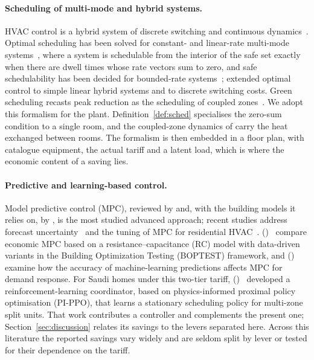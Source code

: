 \documentclass[10pt,a4paper,twocolumn]{article}
\newcommand{\citey}[1]{\citeauthor{#1} (\citeyear{#1})~\citep{#1}}
\theoremstyle{definition}
\begin{document}
\paragraph{Scheduling of multi-mode and hybrid systems.}
HVAC control is a hybrid system of discrete switching and continuous dynamics~\citep{henzinger_2000}. Optimal scheduling has been solved for constant- and linear-rate multi-mode systems~\citep{alur2012optimal,wojtczak2013optimal}, where a system is schedulable from the interior of the safe set exactly when there are dwell times whose rate vectors sum to zero, and safe schedulability has been decided for bounded-rate systems~\citep{alur2013safe}; \citet{mousa2016optimal,mousa2017optimal} extended optimal control to simple linear hybrid systems and to discrete switching costs. Green scheduling recasts peak reduction as the scheduling of coupled zones~\citep{nghiem2011green,nghiem2012scalable}. We adopt this formalism for the plant. Definition~\ref{def:sched} specialises the zero-sum condition to a single room, and the coupled-zone dynamics of \citet{nghiem2012scalable} carry the heat exchanged between rooms. The formalism is then embedded in a floor plan, with catalogue equipment, the actual tariff and a latent load, which is where the economic content of a saving lies.

\paragraph{Predictive and learning-based control.}
Model predictive control (MPC), reviewed by \citet{drgona2020mpc} and, with the building models it relies on, by \citet{kim2022mpcreview}, is the most studied advanced approach; recent studies address forecast uncertainty~\citep{hou2022mpc} and the tuning of MPC for residential HVAC~\citep{dhaliwal2026mpc}. \citey{zheng2024empc} compare economic MPC based on a resistance--capacitance (RC) model with data-driven variants in the Building Optimization Testing (BOPTEST) framework, and \citey{wang2024mldr} examine how the accuracy of machine-learning predictions affects MPC for demand response. For Saudi homes under this two-tier tariff, \citey{rl2026hvac} developed a reinforcement-learning coordinator, based on physics-informed proximal policy optimisation (PI-PPO), that learns a stationary scheduling policy for multi-zone split units. That work contributes a controller and complements the present one; Section~\ref{sec:discussion} relates its savings to the levers separated here. Across this literature the reported savings vary widely and are seldom split by lever or tested for their dependence on the tariff.
\end{document}
